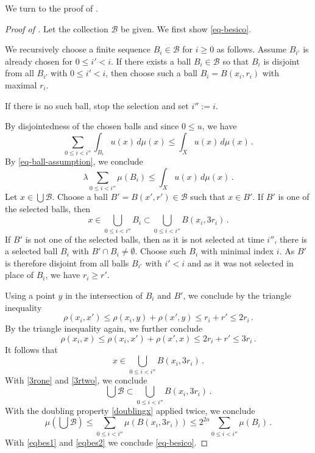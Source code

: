 We turn to the proof of .
\begin{proof}[Proof of ]
\leanok
{}
Let the collection $\mathcal{B}$ be given.
We first show \eqref{eq-besico}.

We recursively choose a finite sequence $B_i\in \mathcal{B}$
for $i\ge 0$ as follows. Assume $B_{i'}$
is already chosen for $0\le i'<i$.
If there exists a ball $B_{i}\in \mathcal{B}$ so that $B_{i}$
is disjoint from all $B_{i'}$
with $0\le i'<i$, then choose
such a ball $B_i=B(x_i,r_i)$ with maximal $r_i$.

If there is no such ball, stop the selection and set
$i'':=i$.

By disjointedness of the chosen balls and since $0 \le u$, we have
\begin{equation}
\sum_{0\le i<i''}\int_{B_i} u(x)\, d\mu(x) \le \int_X u(x)\, d\mu(x)\, .
\end{equation}
By \eqref{eq-ball-assumption}, we conclude
\begin{equation}\label{eqbes1}
\lambda \sum_{0\le i<i''}\mu(B_i)
\le \int_X u(x)\, d\mu(x)\, .
\end{equation}
Let $x\in \bigcup \mathcal{B}$.
Choose a ball $B'=B(x',r')\in \mathcal{B}$
such that $x\in B'$.
If $B'$ is one of the selected balls, then
\begin{equation}\label{3rone}
    x\in \bigcup _{0\le i< i''}B_i\subset \bigcup _{0\le i< i''}B(x_i,3r_i)\, .
\end{equation}
If $B'$ is not one of the selected balls, then as it is not selected at time $i''$, there is a selected ball $B_i$ with
$B'\cap B_i\neq \emptyset$.
Choose such $B_i$ with minimal index $i$. As $B'$ is therefore disjoint from all
balls $B_{i'}$ with $i'<i$ and
as it was not selected in place of $B_i$, we have $r_i\ge r'$.

Using a point $y$ in the intersection of $B_i$ and $B'$,
we conclude by the triangle inequality
\begin{equation}
   \rho(x_i,x')\le \rho(x_i,y)+\rho(x',y)\le r_i+r'\le 2r_i \, .
\end{equation}
By the triangle inequality again, we further conclude
\begin{equation}
   \rho(x_i,x)\le \rho(x_i,x')+\rho(x',x)\le 2r_i+r'\le 3r_i \, .
\end{equation}
It follows that
\begin{equation}\label{3rtwo}
    x\in \bigcup _{0\le i< i''}B(x_i,3r_i)\, .
\end{equation}
With \eqref{3rone} and \eqref{3rtwo}, we conclude
\begin{equation}
\bigcup \mathcal{B}\subset
\bigcup _{0\le i< i''}B(x_i,3r_i)\, .
\end{equation}
With the doubling property
\eqref{doublingx} applied twice, we conclude
\begin{equation}\label{eqbes2}
    \mu(\bigcup{\mathcal{B}})
    \le \sum _{0\le i< i''}\mu (B(x_i,3r_i))
    \le 2^{2a}\sum _{0\le i< i''}\mu (B_i)\, .
\end{equation}
With \eqref{eqbes1} and \eqref{eqbes2} we conclude
\eqref{eq-besico}.



\end{proof}
